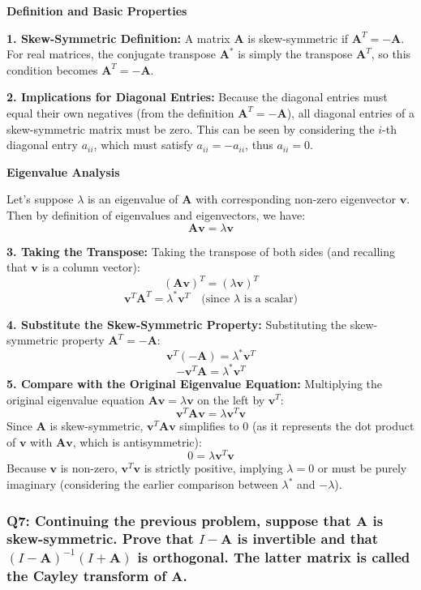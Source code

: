 \documentclass[8pt]{article}
\begin{document}
{{\textbf{Definition and Basic Properties}

\textbf{1. Skew-Symmetric Definition:}
   A matrix \(\mathbf{A}\) is skew-symmetric if \(\mathbf{A}^T = -\mathbf{A}\). For real matrices, the conjugate transpose \( \mathbf{A}^* \) is simply the transpose \( \mathbf{A}^T \), so this condition becomes \(\mathbf{A}^T = -\mathbf{A}\).

\textbf{2. Implications for Diagonal Entries:}
   Because the diagonal entries must equal their own negatives (from the definition \(\mathbf{A}^T = -\mathbf{A}\)), all diagonal entries of a skew-symmetric matrix must be zero. This can be seen by considering the \(i\)-th diagonal entry \( a_{ii} \), which must satisfy \( a_{ii} = -a_{ii} \), thus \( a_{ii} = 0 \).

\textbf{Eigenvalue Analysis}

Let's suppose \(\lambda\) is an eigenvalue of \(\mathbf{A}\) with corresponding non-zero eigenvector \(\mathbf{v}\). Then by definition of eigenvalues and eigenvectors, we have:
\[
\mathbf{A}\mathbf{v} = \lambda \mathbf{v}
\]

\textbf{3. Taking the Transpose:}
   Taking the transpose of both sides (and recalling that \( \mathbf{v} \) is a column vector):
   \[
   (\mathbf{A}\mathbf{v})^T = (\lambda \mathbf{v})^T
   \]
   \[
   \mathbf{v}^T \mathbf{A}^T = \lambda^* \mathbf{v}^T \quad \text{(since } \lambda \text{ is a scalar)}
   \]

\textbf{4. Substitute the Skew-Symmetric Property:}
   Substituting the skew-symmetric property \( \mathbf{A}^T = -\mathbf{A} \):
   \[
   \mathbf{v}^T (-\mathbf{A}) = \lambda^* \mathbf{v}^T
   \]
   \[
   -\mathbf{v}^T \mathbf{A} = \lambda^* \mathbf{v}^T
   \]
\textbf{5. Compare with the Original Eigenvalue Equation:}
   Multiplying the original eigenvalue equation \(\mathbf{A}\mathbf{v} = \lambda \mathbf{v}\) on the left by \(\mathbf{v}^T\):
   \[
   \mathbf{v}^T \mathbf{A} \mathbf{v} = \lambda \mathbf{v}^T \mathbf{v}
   \]
   Since \(\mathbf{A}\) is skew-symmetric, \(\mathbf{v}^T \mathbf{A} \mathbf{v}\) simplifies to \(0\) (as it represents the dot product of \(\mathbf{v}\) with \(\mathbf{A}\mathbf{v}\), which is antisymmetric):
   \[
   0 = \lambda \mathbf{v}^T \mathbf{v}
   \]
   Because \(\mathbf{v}\) is non-zero, \(\mathbf{v}^T \mathbf{v}\) is strictly positive, implying \(\lambda = 0\) or must be purely imaginary (considering the earlier comparison between \(\lambda^*\) and \(-\lambda\)).


\subsubsection*{Q7: Continuing the previous problem, suppose that \(\mathbf{A}\) is skew-symmetric. Prove that \(I - \mathbf{A}\) is invertible and that \((I - \mathbf{A})^{-1}(I + \mathbf{A})\) is orthogonal. The latter matrix is called the Cayley transform of \(\mathbf{A}\).}

}}
\end{document}
